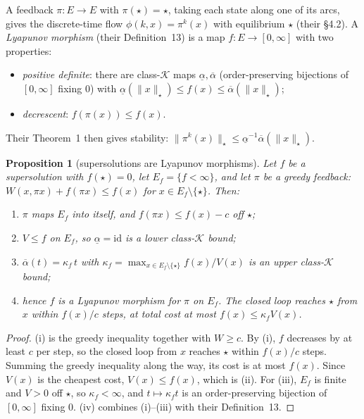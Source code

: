 \documentclass[11pt]{article}
\newtheorem{proposition}[theorem]{Proposition}
\theoremstyle{definition}
\theoremstyle{remark}
\newcommand{\tgt}{\star}
\begin{document}
A feedback $\pi : E \to E$ with $\pi(\tgt) = \tgt$, taking each state along one
of its arcs, gives the discrete-time flow $\phi(k, x) = \pi^k(x)$ with equilibrium
$\tgt$ (their \S4.2). A \emph{Lyapunov morphism} (their Definition~13) is a map
$f : E \to [0,\infty]$ with two properties:
\begin{itemize}[nosep]
\item \emph{positive definite}: there are class-$\mathcal K$ maps
  $\underline\alpha, \overline\alpha$ (order-preserving bijections of $[0,\infty]$
  fixing $0$) with
  $\underline\alpha(\|x\|_\tgt) \le f(x) \le \overline\alpha(\|x\|_\tgt)$;
\item \emph{decrescent}: $f(\pi(x)) \le f(x)$.
\end{itemize}
Their Theorem~1 then gives stability: $\|\pi^k(x)\|_\tgt \le
\underline\alpha^{-1}\overline\alpha(\|x\|_\tgt)$.

\begin{proposition}[supersolutions are Lyapunov morphisms]\label{prop:clf}
Let $f$ be a supersolution with $f(\tgt) = 0$, let $E_f = \{f < \infty\}$, and let
$\pi$ be a greedy feedback: $W(x,\pi x) + f(\pi x) \le f(x)$ for $x \in E_f
\setminus \{\tgt\}$. Then:
\begin{enumerate}[label=(\roman*),nosep]
\item $\pi$ maps $E_f$ into itself, and $f(\pi x) \le f(x) - c$ off $\tgt$;
\item $V \le f$ on $E_f$, so $\underline\alpha = \mathrm{id}$ is a lower class-$\mathcal K$ bound;
\item $\overline\alpha(t) = \kappa_f\, t$ with
  $\kappa_f = \max_{x \in E_f \setminus\{\tgt\}} f(x)/V(x)$ is an upper
  class-$\mathcal K$ bound;
\item hence $f$ is a Lyapunov morphism for $\pi$ on $E_f$. The closed loop reaches
  $\tgt$ from $x$ within $f(x)/c$ steps, at total cost at most
  $f(x) \le \kappa_f V(x)$.
\end{enumerate}
\end{proposition}
\begin{proof}
(i) is the greedy inequality together with $W \ge c$. By (i), $f$ decreases by at
least $c$ per step, so the closed loop from $x$ reaches $\tgt$ within $f(x)/c$
steps. Summing the greedy inequality along the way, its cost is at most $f(x)$.
Since $V(x)$ is the cheapest cost, $V(x) \le f(x)$, which is (ii). For (iii),
$E_f$ is finite and $V > 0$ off $\tgt$, so $\kappa_f < \infty$, and $t \mapsto
\kappa_f t$ is an order-preserving bijection of $[0,\infty]$ fixing $0$. (iv)
combines (i)--(iii) with their Definition~13.
\end{proof}
\end{document}
